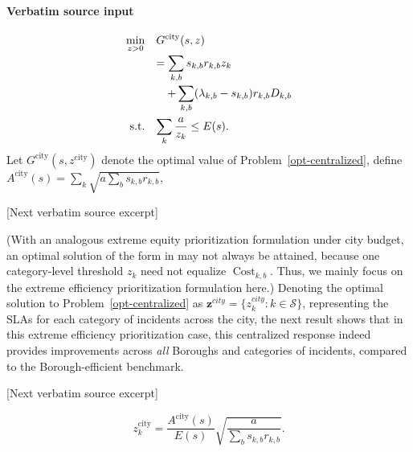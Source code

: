 \documentclass[10pt]{article}
\begin{document}
\paragraph{Verbatim source input}
\begin{ReviewVerbatim}
\begin{subequations}
\begin{align}
    {\min_{z>0}}\quad
    &{G^{\mathrm{city}}(s,z)}\notag\\[-2pt]
    &{=\sum_{k,b}s_{k,b}r_{k,b}z_k}\notag\\[-2pt]
    &{\quad+\sum_{k,b}(\lambda_{k,b}-s_{k,b})r_{k,b}D_{k,b}}\\
    {\textnormal{s.t.}}\quad
    &{\sum_k\frac{a}{z_k}\leq E(s).}
\end{align}
\label{opt-centralized}
\end{subequations}
Let $G^{\mathrm{city}}(s,z^{\mathrm{city}})$ denote the optimal value of Problem~\eqref{opt-centralized}, define
${A^{\mathrm{city}}(s)}=\sum_k\sqrt{a\sum_b s_{k,b}r_{k,b}},$

[Next verbatim source excerpt]

(With an analogous extreme equity prioritization formulation under city budget, an optimal solution of the form in  may not always be attained, because one category-level threshold $z_k$ need not equalize $\operatorname{Cost}_{k,b}$. Thus, we mainly focus on the extreme efficiency prioritization formulation here.) Denoting the optimal solution to Problem~\eqref{opt-centralized} as $\textbf{z}^{city}=\{z^{city}_k: k\in \mathcal{S}\}$, representing the SLAs for each category of incidents across the city, the next result shows that in this extreme efficiency prioritization case, this centralized response indeed provides improvements across \textit{all} Boroughs and categories of incidents, compared to the Borough-efficient benchmark.

[Next verbatim source excerpt]

\begin{equation*}
 z^{\mathrm{city}}_k
 =\frac{A^{\mathrm{city}}(s)}{E(s)}
   \sqrt{\frac{a}{\sum_b s_{k,b}r_{k,b}}}.
\end{equation*}
\end{ReviewVerbatim}
\end{document}
